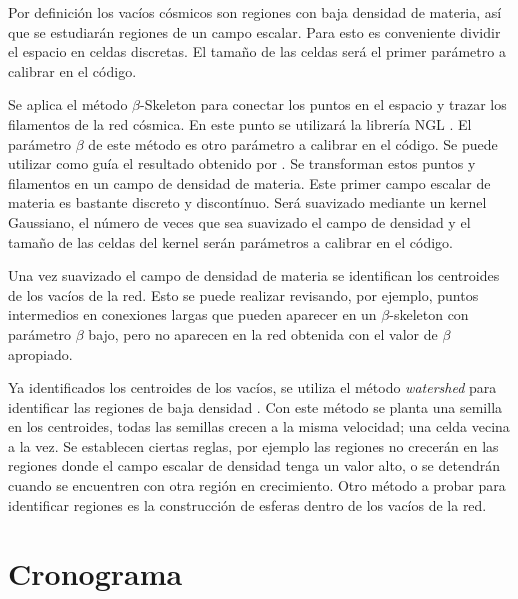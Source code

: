 \documentclass[preprint]{aastex62}
\begin{document}
  Por definición los vacíos cósmicos son regiones con baja densidad de materia, así que se
  estudiarán regiones de un campo escalar. Para esto es conveniente dividir el espacio en
  celdas discretas. El tamaño de las celdas será el primer parámetro a calibrar en el código.
  
  Se aplica el método $\beta$-Skeleton para conectar los puntos en el espacio y trazar los
  filamentos de la red cósmica. En este punto se utilizará la librería NGL \citep{ngl}.
  El parámetro $\beta$ de este método es otro parámetro a calibrar en el código. Se puede
  utilizar como guía el resultado obtenido por \citet{Fang2018}.
  Se transforman estos puntos y filamentos en un campo de densidad de materia. Este primer
  campo escalar de materia es bastante discreto y discontínuo. Será suavizado mediante un
  kernel Gaussiano, el número de veces que sea suavizado el campo de densidad y el tamaño de
  las celdas del kernel serán parámetros a calibrar en el código.

  Una vez suavizado el campo de densidad de materia se identifican los centroides
  de los vacíos de la red. Esto se puede realizar revisando, por ejemplo, puntos intermedios
  en conexiones largas que pueden aparecer en un $\beta$-skeleton con parámetro $\beta$ bajo,
  pero no aparecen en la red obtenida con el valor de $\beta$ apropiado.

  Ya identificados los centroides de los vacíos, se utiliza el método \textit{watershed}
  para identificar las regiones de baja densidad \citep{Sutter2015}. Con este método
  se planta una semilla en los centroides, todas las semillas crecen a la misma velocidad; una
  celda vecina a la vez. Se establecen ciertas reglas, por ejemplo las regiones no crecerán en
  las regiones donde el campo escalar de densidad tenga un valor alto, o se detendrán cuando
  se encuentren con otra región en crecimiento. Otro método a probar para identificar regiones
  es la construcción de esferas dentro de los vacíos de la red. 

  \section{Cronograma}
\end{document}
